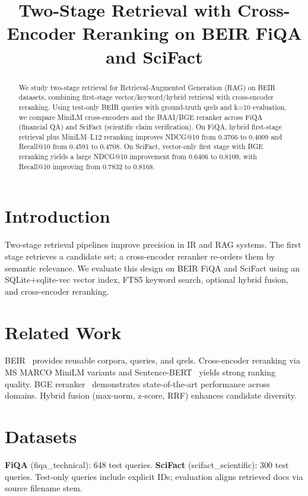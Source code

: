\documentclass[conference]{IEEEtran}
\title{Two-Stage Retrieval with Cross-Encoder Reranking on BEIR FiQA and SciFact}
\author{\IEEEauthorblockN{RAG Team}
\IEEEauthorblockA{OpenAI Opus Experiments}}
\begin{document}
\maketitle

\begin{abstract}
We study two-stage retrieval for Retrieval-Augmented Generation (RAG) on BEIR datasets, combining first-stage vector/keyword/hybrid retrieval with cross-encoder reranking. Using test-only BEIR queries with ground-truth qrels and k=10 evaluation, we compare MiniLM cross-encoders and the BAAI/BGE reranker across FiQA (financial QA) and SciFact (scientific claim verification). On FiQA, hybrid first-stage retrieval plus MiniLM--L12 reranking improves NDCG@10 from 0.3766 to 0.4009 and Recall@10 from 0.4591 to 0.4708. On SciFact, vector-only first stage with BGE reranking yields a large NDCG@10 improvement from 0.6406 to 0.8109, with Recall@10 improving from 0.7832 to 0.8168.
\end{abstract}

\section{Introduction}
Two-stage retrieval pipelines improve precision in IR and RAG systems. The first stage retrieves a candidate set; a cross-encoder reranker re-orders them by semantic relevance. We evaluate this design on BEIR FiQA and SciFact using an SQLite+sqlite-vec vector index, FTS5 keyword search, optional hybrid fusion, and cross-encoder reranking.

\section{Related Work}
BEIR~\cite{thakur2021beir} provides reusable corpora, queries, and qrels. Cross-encoder reranking via MS MARCO MiniLM variants and Sentence-BERT~\cite{reimers2019sentencebert} yields strong ranking quality. BGE reranker~\cite{baai2023bge} demonstrates state-of-the-art performance across domains. Hybrid fusion (max-norm, z-score, RRF) enhances candidate diversity.

\section{Datasets}
\textbf{FiQA} (fiqa\_technical): 648 test queries. \textbf{SciFact} (scifact\_scientific): 300 test queries. Test-only queries include explicit IDs; evaluation aligns retrieved docs via source filename stem.
\end{document}
